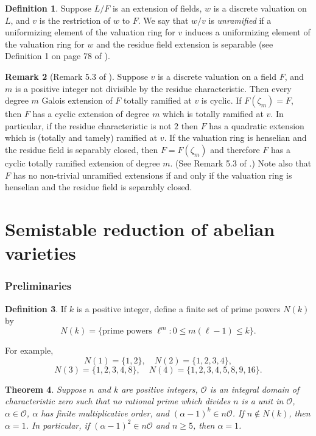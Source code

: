 \documentclass{amsart}
\def\O{{\mathcal O}}
\newtheorem{thm}{Theorem}[section]
\theoremstyle{definition}
\newtheorem{defn}[thm]{Definition}
\newtheorem{rem}[thm]{Remark}
\begin{document}
\begin{defn}
Suppose $L/F$ is an extension of fields, $w$ is a discrete valuation
on $L$, and $v$ is the restriction of $w$ to $F$. We say that
$w/v$ is {\em unramified} if a uniformizing element of the
valuation ring for $v$
induces a uniformizing element of the valuation ring for $w$
and the residue field extension is separable (see Definition 1
on page 78 of \cite{BLR}).
\end{defn}

\begin{rem}[Remark 5.3 of \cite{semistab}]
\label{ramifiedcyclic}
Suppose $v$ is a discrete valuation on a field $F$, and $m$ is a positive
integer not divisible by the residue characteristic. Then every 
degree $m$ Galois extension of $F$ totally
ramified at $v$ is cyclic. If $F(\zeta_m) = F$,
then $F$ has a cyclic extension of degree $m$ which is totally ramified at
$v$. In particular, if the residue characteristic is not $2$ then 
$F$ has a quadratic extension which is (totally and tamely) ramified at $v$.
If the valuation ring is henselian and the residue field is separably closed, 
then $F= F(\zeta_m)$ and therefore $F$ has a cyclic totally ramified extension 
of degree $m$. (See Remark 5.3 of \cite{semistab}.)
Note also that $F$ has no non-trivial unramified extensions if and only if 
the valuation ring is henselian and the residue field is separably closed.
\end{rem}

\part{Semistable reduction of abelian varieties}
\label{semistabpart}

\section{Preliminaries}

\begin{defn}
If $k$ is a positive integer, define a finite set 
of prime powers $N(k)$ by 
$$N(k) = \{\text{prime powers $\ell^m : 0 \le m(\ell - 1) \le k $}\}.$$
\end{defn}
For example, $$N(1) = \{1, 2\}, \quad N(2) = \{1, 2, 3, 4\},$$
$$N(3) = \{1, 2, 3, 4, 8\},  \quad  
N(4) = \{1, 2, 3, 4, 5, 8, 9, 16\}.$$

\begin{thm}
\label{quasithm}
Suppose $n$ and $k$ are positive integers, $\O$ is an integral 
domain of characteristic zero such that no rational prime which 
divides $n$ 
is a unit in $\O$, $\alpha \in \O$, $\alpha$ has finite 
multiplicative order, 
and $(\alpha - 1)^k \in n\O$.
If $n \notin N(k)$, then $\alpha = 1$. In particular, if
$(\alpha - 1)^2 \in n\O$ and $n \ge 5$, then $\alpha = 1$.
\end{thm}
\end{document}
